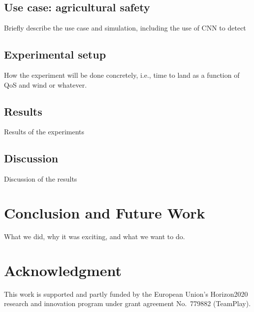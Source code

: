 \documentclass[conference]{IEEEtran}
\begin{document}
\subsection{Use case: agricultural safety}

Briefly describe the use case and simulation, including the use of CNN
to detect

\subsection{Experimental setup}

How the experiment will be done concretely, i.e., time to land as a
function of QoS and wind or whatever.

\subsection{Results}

Results of the experiments

\subsection{Discussion}

Discussion of the results

\section{Conclusion and Future Work}
\label{sec:conclusion}

What we did, why it was exciting, and what we want to do.

\section*{Acknowledgment}

This work is supported and partly funded by the European Union’s Horizon2020 research and innovation program under grant agreement No.~779882 (TeamPlay).


 
\vspace{1ex}
\end{document}
